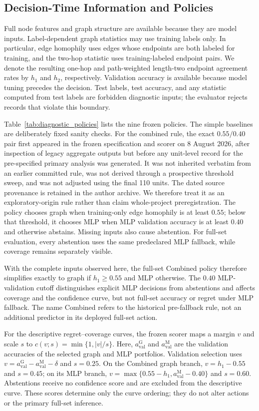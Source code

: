 \subsection{Decision-Time Information and Policies}

Full node features and graph structure are available because they are model inputs. Label-dependent graph statistics may use training labels only. In particular, edge homophily uses edges whose endpoints are both labeled for training, and the two-hop statistic uses training-labeled endpoint pairs. We denote the resulting one-hop and path-weighted length-two endpoint agreement rates by $h_1$ and $h_2$, respectively. Validation accuracy is available because model tuning precedes the decision. Test labels, test accuracy, and any statistic computed from test labels are forbidden diagnostic inputs; the evaluator rejects records that violate this boundary.

Table~\ref{tab:diagnostic_policies} lists the nine frozen policies. The simple baselines are deliberately fixed sanity checks. For the combined rule, the exact $0.55/0.40$ pair first appeared in the frozen specification and scorer on 8 August 2026, after inspection of legacy aggregate outputs but before any unit-level record for the pre-specified primary analysis was generated. It was not inherited verbatim from an earlier committed rule, was not derived through a prospective threshold sweep, and was not adjusted using the final 110 units. The dated source provenance is retained in the author archive. We therefore treat it as an exploratory-origin rule rather than claim whole-project preregistration. The policy chooses graph when training-only edge homophily is at least $0.55$; below that threshold, it chooses MLP when MLP validation accuracy is at least $0.40$ and otherwise abstains. Missing inputs also cause abstention. For full-set evaluation, every abstention uses the same predeclared MLP fallback, while coverage remains separately visible.

With the complete inputs observed here, the full-set Combined policy therefore simplifies exactly to graph if $h_1\geq0.55$ and MLP otherwise. The $0.40$ MLP-validation cutoff distinguishes explicit MLP decisions from abstentions and affects coverage and the confidence curve, but not full-set accuracy or regret under MLP fallback. The name Combined refers to the historical pre-fallback rule, not an additional predictor in its deployed full-set action.

For the descriptive regret--coverage curves, the frozen scorer maps a margin $v$ and scale $s$ to $c(v;s)=\min\{1,|v|/s\}$. Here, $a_{\mathrm{val}}^{\mathrm{G}}$ and $a_{\mathrm{val}}^{\mathrm{M}}$ are the validation accuracies of the selected graph and MLP portfolios. Validation selection uses $v=a_{\mathrm{val}}^{\mathrm{G}}-a_{\mathrm{val}}^{\mathrm{M}}-\delta$ and $s=0.25$. On the Combined graph branch, $v=h_1-0.55$ and $s=0.45$; on its MLP branch, $v=\max\{0.55-h_1,a_{\mathrm{val}}^{\mathrm{M}}-0.40\}$ and $s=0.60$. Abstentions receive no confidence score and are excluded from the descriptive curve. These scores determine only the curve ordering; they do not alter actions or the primary full-set inference.

